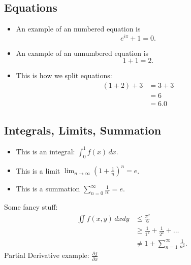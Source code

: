 \documentclass{article}
\begin{document}
		\subsection{Equations}
			\begin{itemize}
				\item An example of an numbered equation is
				\begin{equation}
					e^{i\pi} + 1 = 0.
				\end{equation}
				\item An example of an unnumbered equation is
				\begin{equation*}
					1 + 1 = 2.
				\end{equation*}	
				\item This is how we split equations:
				\begin{equation}
					\begin{split}
						(1 + 2) + 3 &= 3 + 3\\
						            &= 6\\
						            &= 6.0
					\end{split}
				\end{equation}
			\end{itemize}
		\subsection{Integrals, Limits, Summation}
			\begin{itemize}
				\item This is an integral: $\int_{0}^{1}f(x)\,dx$.
				\item This is a limit $\lim_{n\to\infty} (1 + \frac{1}{n})^{n} = e$.
				\item This is a summation $\sum_{n=0}^{\infty} \frac{1}{n!} = e$.
			\end{itemize}
			Some fancy stuff:
			\begin{equation*}
				\begin{split}
					\iint f(x,y)\,dxdy &\leq \frac{\pi^{2}}{6}\\
					& \geq \frac{1}{1^{2}}+\frac{1}{2^{2}} + \dots\\
					& \neq 1+\sum_{n=1}^{\infty}\frac{1}{n^{2}}.
				\end{split}
			\end{equation*}
			Partial Derivative example: $\frac{\partial f}{\partial x}$
\end{document}
